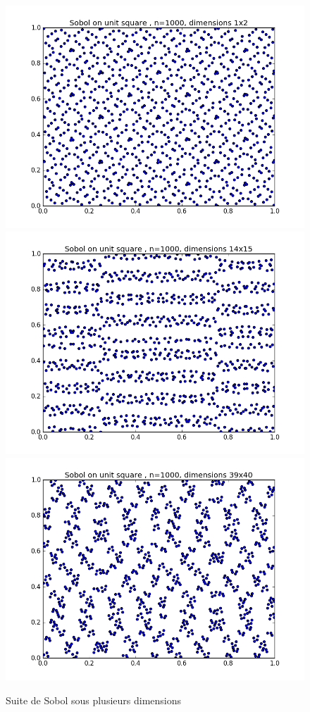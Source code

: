 \documentclass[12pt]{report}
\begin{document}
\begin{figure}[h]
	\centering
	\includegraphics[scale=0.4]{figure_4-sobol 1000 dimensions 1x2.png}
	\includegraphics[scale=0.4]{figure_4-sobol 1000 dimensions 14x15.png}
	\includegraphics[scale=0.4]{figure_4-sobol 1000 dimensions 39x40.png}
	\caption{Suite de Sobol sous plusieurs dimensions}	
\end{figure}
\clearpage
\end{document}
